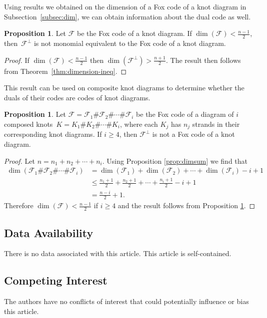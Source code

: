 \documentclass[11pt,a4paper]{article}
\theoremstyle{definition}
\newtheorem{proposition}[theorem]{Proposition}
\newcommand{\mF}{\mathcal{F}}
\begin{document}
Using results we obtained on the dimension of a Fox code of a knot diagram in Subsection~\ref{subsec:dim}, we can obtain information about the dual code as well.


\begin{proposition}
\label{prop:duallimit}
Let $\mF$ be the Fox code of a knot diagram. If $\dim(\mF) < \frac{n-1}{2}$, then~$\mF^\perp$ is not monomial equivalent to the Fox code of a knot diagram.
\end{proposition}
\begin{proof}
If $\dim(\mF) < \frac{n-1}{2}$ then $\dim(\mF^\perp) > \frac{n+1}{2}$.
The result then follows from Theorem~\ref{thm:dimension-ineq}.
\end{proof}


This result can be used on composite knot diagrams to determine whether the duals of their codes are codes of knot diagrams.
\begin{proposition}
\label{prop:4componentdual}
Let $\mF = \mF_1 \# \mF_2 \# \cdots \# \mF_i$ be the Fox code of a diagram of $i$ composed knots~$K = K_1 \# K_2 \# \cdots \# K_i$, where each $K_j$ has $n_j$ strands in their corresponding knot diagrams. If $i \geq 4$, then $\mF^\perp$ is not a Fox code of a knot diagram. 
\end{proposition}
\begin{proof}
Let $n = n_1 + n_2 + \cdots + n_i$.
Using Proposition \ref{prop:dimsum} we find that 
\begin{align*}
    \dim(\mF_1 \# \mF_2 \#\cdots \# \mF_i) &= \dim(\mF_1) + \dim(\mF_2) + \cdots + \dim(\mF_i) - i + 1 \\
    &\leq \frac{n_1 + 1}{2} + \frac{n_2 + 1}{2} + \cdots + \frac{n_i + 1}{2} - i + 1 \\
    &= \frac{n - i}{2} + 1.
\end{align*}
Therefore $\dim(\mF) < \frac{n-1}{2}$ if $i \geq 4$ and the result follows from Proposition \ref{prop:duallimit}.
\end{proof}


\subsection*{Data Availability}
There is no data associated with this article. This article is self-contained. 
\subsection*{Competing Interest}
The authors have no conflicts of interest that could potentially influence or bias this article. 
\end{document}
